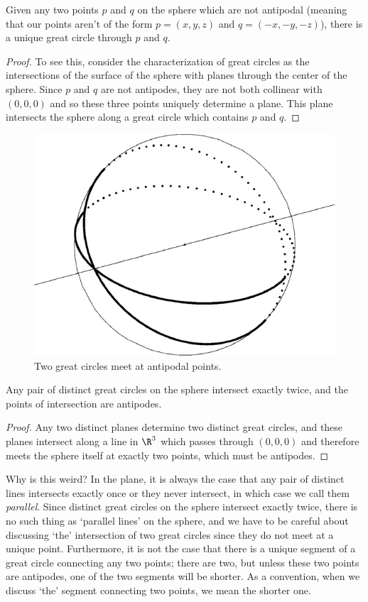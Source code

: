 \begin{claim}
	Given any two points $p$ and $q$ on the sphere which are not antipodal (meaning that our points aren't of the form $p=(x,y,z)$ and $q=(-x,-y,-z)$), there is a unique great circle through $p$ and $q$. 
\end{claim}
\begin{proof}
To see this, consider the characterization of great circles as the intersections of the surface of the sphere with planes through the center of the sphere.  Since $p$ and $q$ are not antipodes, they are not both collinear with $(0,0,0)$ and so these three points uniquely determine a plane.  This plane intersects the sphere along a great circle which contains $p$ and $q$.
\end{proof}

\begin{figure}[htb]
	\centering
	\includegraphics[width=.35\textwidth]{figs/2gc.pdf}
	\caption{Two great circles meet at antipodal points.}
	\label{fig:2gc}
\end{figure}


\begin{claim}
	Any pair of distinct great circles on the sphere intersect exactly twice, and the points of intersection are antipodes.
\end{claim}
\begin{proof}
Any two distinct planes determine two distinct great circles, and these planes intersect along a line in $\R^3$ which passes through $(0,0,0)$ and therefore meets the sphere itself at exactly two points, which must be antipodes.
\end{proof}

Why is this weird? In the plane, it is always the case that any pair of distinct lines intersects exactly once or they never intersect, in which case we call them \textit{parallel}. Since distinct great circles on the sphere intersect exactly twice, there is no such thing as `parallel lines' on the sphere, and we have to be careful about discussing `the' intersection of two great circles since they do not meet at a unique point.  Furthermore, it is not the case that there is a unique segment of a great circle connecting any two points; there are two, but unless these two points are antipodes, one of the two segments will be shorter.  As a convention, when we discuss `the' segment connecting two points, we mean the shorter one.  

